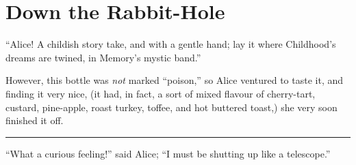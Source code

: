 \chapter{Down the Rabbit-Hole}
\begin{ChapterNote}
``Alice! A childish story take, and with a gentle hand;
lay it where Childhood's dreams are twined, in Memory's mystic band.''
\end{ChapterNote}
\begin{Standard}
However, this bottle was \emph{not} marked ``poison,'' so Alice ventured to taste it,
and finding it very nice, (it had, in fact, a sort of mixed flavour of cherry-tart,
custard, pine-apple, roast turkey, toffee, and hot buttered toast,) she very soon
finished it off.

\fancybreak{* * *}

``What a curious feeling!'' said Alice; ``I must be shutting up like a telescope.''
\end{Standard}

